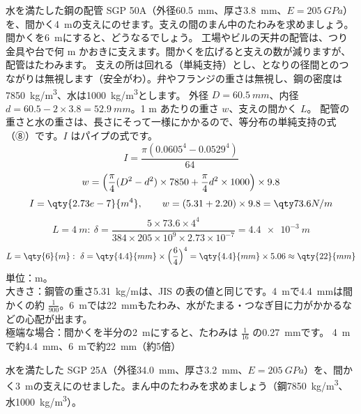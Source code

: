 \begin{phreidai}
\label{ph:力-10:ex11}水を満たした鋼の配管 SGP 50A（外径\qty{60.5}{mm}、厚さ\qty{3.8}{mm}、$E=\qty{205}{GPa}$）を、間かく\qty{4}{m}の支えにのせます。支えの間のまん中のたわみを求めましょう。間かくを\qty{6}{m}にすると、どうなるでしょう。
\phbamen
工場やビルの天井の配管は、つり金具や台で何 m かおきに支えます。間かくを広げると支えの数が減りますが、配管はたわみます。
\phmushi
支えの所は回れる（単純支持）とし、となりの径間とのつながりは無視します（安全がわ）。弁やフランジの重さは無視し、鋼の密度は\qty{7850}{kg/m^3}、水は\qty{1000}{kg/m^3}とします。
\phzu
外径 $D=\qty{60.5}{mm}$、内径 $d=60.5-2\times3.8=\qty{52.9}{mm}$。1 m あたりの重さ $w$、支えの間かく $L$。
\phriyu
配管の重さと水の重さは、長さにそって一様にかかるので、等分布の単純支持の式（⑧）です。$I$ はパイプの式です。
\phtateru
\[ I=\frac{\pi(0.0605^4-0.0529^4)}{64} \]
\[ w=\Bigl(\frac{\pi}{4}(D^2-d^2)\times7850+\frac{\pi}{4}d^2\times1000\Bigr)\times9.8 \]
\phtoku
\[ I=\qty{2.73e-7}{m^4},\qquad w=(5.31+2.20)\times9.8=\pxkq{73.6}{N/m} \]
\[ L=\qty{4}{m}:\ \delta=\frac{5\times73.6\times4^4}{384\times205\times10^9\times2.73\times10^{-7}}=\qty{4.4e-3}{m} \]
\[ L=\qty{6}{m}:\ \delta=\qty{4.4}{mm}\times\Bigl(\frac{6}{4}\Bigr)^4=\qty{4.4}{mm}\times5.06\approx\qty{22}{mm} \]
\phtashikame
単位：m。\\
大きさ：鋼管の重さ\qty{5.31}{kg/m}は、JIS の表の値と同じです。\qty{4}{m}で\qty{4.4}{mm}は間かくの約 $\tfrac{1}{900}$。\qty{6}{m}では\qty{22}{mm}もたわみ、水がたまる・つなぎ目に力がかかるなどの心配が出ます。\\
極端な場合：間かくを半分の\qty{2}{m}にすると、たわみは $\tfrac{1}{16}$ の\qty{0.27}{mm}です。
\kotae \qty{4}{m}で約\qty{4.4}{mm}、\qty{6}{m}で約\qty{22}{mm}（約5倍）
\end{phreidai}
\begin{jibun}
水を満たした SGP 25A（外径\qty{34.0}{mm}、厚さ\qty{3.2}{mm}、$E=\qty{205}{GPa}$）を、間かく\qty{3}{m}の支えにのせました。まん中のたわみを求めましょう（鋼\qty{7850}{kg/m^3}、水\qty{1000}{kg/m^3}）。
\end{jibun}

